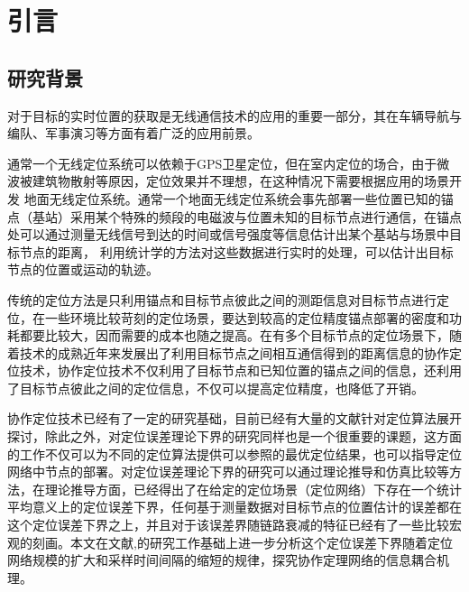 \chapter{引言}
\label{cha:intro}

\section{研究背景}
对于目标的实时位置的获取是无线通信技术的应用的重要一部分\cite{indoorPos}，其在车辆导航与编队、军事演习等方面有着广泛的应用前景。


通常一个无线定位系统可以依赖于GPS卫星定位，但在室内定位的场合，由于微波被建筑物散射等原因，定位效果并不理想，在这种情况下需要根据应用的场景开发
地面无线定位系统。通常一个地面无线定位系统会事先部署一些位置已知的锚点（基站）采用某个特殊的频段的电磁波与位置未知的目标节点进行通信，在锚点处可以通过测量无线信号到达的时间或信号强度等信息估计出某个基站与场景中目标节点的距离，
利用统计学的方法对这些数据进行实时的处理，可以估计出目标节点的位置或运动的轨迹。


传统的定位方法是只利用锚点和目标节点彼此之间的测距信息对目标节点进行定位，在一些环境比较苛刻的定位场景，要达到较高的定位精度锚点部署的密度和功耗都要比较大，因而需要的成本也随之提高。在有多个目标节点的定位场景下，随着技术的成熟近年来发展出了利用目标节点之间相互通信得到的距离信息的协作定位技术，协作定位技术不仅利用了目标节点和已知位置的锚点之间的信息，还利用了目标节点彼此之间的定位信息，不仅可以提高定位精度，也降低了开销。


协作定位技术已经有了一定的研究基础，目前已经有大量的文献针对定位算法展开探讨，除此之外，对定位误差理论下界的研究同样也是一个很重要的课题，这方面的工作不仅可以为不同的定位算法提供可以参照的最优定位结果，也可以指导定位网络中节点的部署。对定位误差理论下界的研究可以通过理论推导和仿真比较等方法，在理论推导方面，已经得出了在给定的定位场景（定位网络）下存在一个统计平均意义上的定位误差下界\cite{LimitBound}，任何基于测量数据对目标节点的位置估计的误差都在这个定位误差下界之上，并且对于该误差界随链路衰减的特征已经有了一些比较宏观的刻画\cite{siyi}。本文在文献\cite{LimitBound},\cite{siyi}的研究工作基础上进一步分析这个定位误差下界随着定位网络规模的扩大和采样时间间隔的缩短的规律，探究协作定理网络的信息耦合机理。

